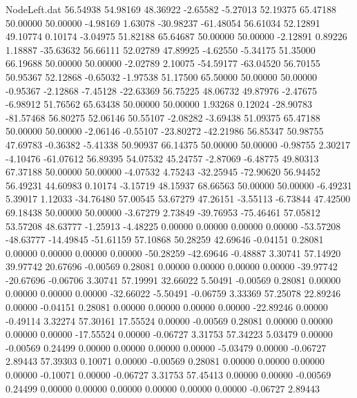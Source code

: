 \begin{filecontents}{NodeLeft.dat}
  56.54938   54.98169   48.36922    -2.65582   -5.27013   52.19375   65.47188   50.00000   50.00000   -4.98169    1.63078  -30.98237  -61.48054
  56.61034   52.12891   49.10774     0.10174   -3.04975   51.82188   65.64687   50.00000   50.00000   -2.12891    0.89226    1.18887  -35.63632
  56.66111   52.02789   47.89925    -4.62550   -5.34175   51.35000   66.19688   50.00000   50.00000   -2.02789    2.10075  -54.59177  -63.04520
  56.70155   50.95367   52.12868    -0.65032   -1.97538   51.17500   65.50000   50.00000   50.00000   -0.95367   -2.12868   -7.45128  -22.63369
  56.75225   48.06732   49.87976    -2.47675   -6.98912   51.76562   65.63438   50.00000   50.00000    1.93268    0.12024  -28.90783  -81.57468
  56.80275   52.06146   50.55107    -2.08282   -3.69438   51.09375   65.47188   50.00000   50.00000   -2.06146   -0.55107  -23.80272  -42.21986
  56.85347   50.98755   47.69783    -0.36382   -5.41338   50.90937   66.14375   50.00000   50.00000   -0.98755    2.30217   -4.10476  -61.07612
  56.89395   54.07532   45.24757    -2.87069   -6.48775   49.80313   67.37188   50.00000   50.00000   -4.07532    4.75243  -32.25945  -72.90620
  56.94452   56.49231   44.60983     0.10174   -3.15719   48.15937   68.66563   50.00000   50.00000   -6.49231    5.39017    1.12033  -34.76480
  57.00545   53.67279   47.26151    -3.55113   -6.73844   47.42500   69.18438   50.00000   50.00000   -3.67279    2.73849  -39.76953  -75.46461
  57.05812   53.57208   48.63777    -1.25913   -4.48225    0.00000    0.00000    0.00000    0.00000  -53.57208  -48.63777  -14.49845  -51.61159
  57.10868   50.28259   42.69646    -0.04151    0.28081    0.00000    0.00000    0.00000    0.00000  -50.28259  -42.69646   -0.48887    3.30741
  57.14920   39.97742   20.67696    -0.00569    0.28081    0.00000    0.00000    0.00000    0.00000  -39.97742  -20.67696   -0.06706    3.30741
  57.19991   32.66022    5.50491    -0.00569    0.28081    0.00000    0.00000    0.00000    0.00000  -32.66022   -5.50491   -0.06759    3.33369
  57.25078   22.89246    0.00000    -0.04151    0.28081    0.00000    0.00000    0.00000    0.00000  -22.89246    0.00000   -0.49114    3.32274
  57.30161   17.55524    0.00000    -0.00569    0.28081    0.00000    0.00000    0.00000    0.00000  -17.55524    0.00000   -0.06727    3.31753
  57.34223    5.03479    0.00000    -0.00569    0.24499    0.00000    0.00000    0.00000    0.00000   -5.03479    0.00000   -0.06727    2.89443
  57.39303    0.10071    0.00000    -0.00569    0.28081    0.00000    0.00000    0.00000    0.00000   -0.10071    0.00000   -0.06727    3.31753
  57.45413    0.00000    0.00000    -0.00569    0.24499    0.00000    0.00000    0.00000    0.00000    0.00000    0.00000   -0.06727    2.89443

\end{filecontents}
